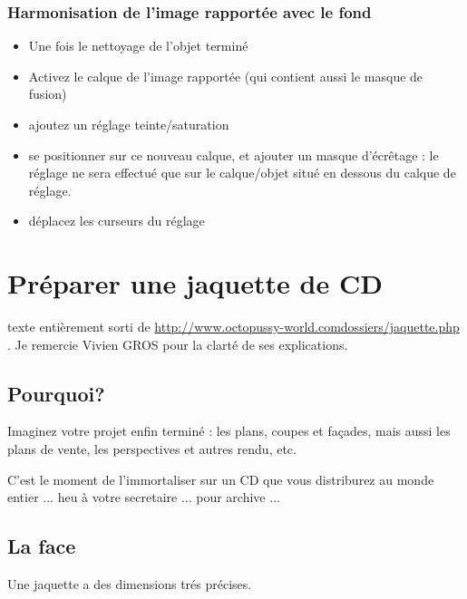 \documentclass[a4paper,12pt,french]{sphinxmanual}
\begin{document}
\subsubsection{Harmonisation de l'image rapportée avec le fond}
\label{psd/insertion:harmonisation-de-l-image-rapportee-avec-le-fond}\begin{itemize}
\item {} 
Une fois le nettoyage de l'objet terminé

\item {} 
Activez le calque de l'image rapportée (qui contient aussi le masque de fusion)

\item {} 
ajoutez un réglage teinte/saturation

\item {} 
se positionner sur ce nouveau calque, et  ajouter un masque d'écrêtage : le réglage ne sera effectué que sur le calque/objet situé en dessous du calque de réglage.

\item {} 
déplacez les curseurs du réglage 

\end{itemize}


\section{Préparer une jaquette de CD}
\label{psd/jaquette_CD:preparer-une-jaquette-de-cd}\label{psd/jaquette_CD::doc}
texte entièrement sorti de \url{http://www.octopussy-world.comdossiers/jaquette.php} . Je remercie Vivien GROS pour la clarté de ses explications.


\subsection{Pourquoi?}
\label{psd/jaquette_CD:pourquoi}
Imaginez votre projet enfin terminé : les plans, coupes et façades, mais aussi les plans de vente, les perspectives et autres rendu, etc.

C'est le moment de l'immortaliser sur un CD que vous distriburez au monde entier ... heu à votre secretaire ... pour archive ...


\subsection{La face}
\label{psd/jaquette_CD:la-face}
Une jaquette a des dimensions trés précises.
\end{document}
